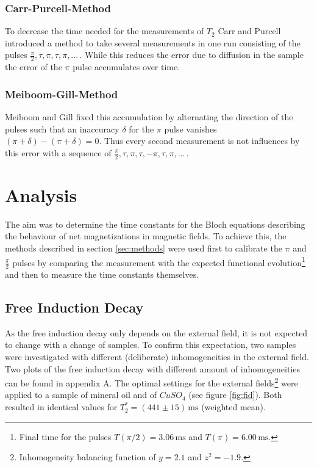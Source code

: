 \documentclass[a4paper]{scrartcl}
\numberwithin{equation}{section}
\numberwithin{figure}{section}
\numberwithin{table}{section}
\begin{document}
\subsubsection*{Carr-Purcell-Method}
To decrease the time needed for the measurements of $T_2$ Carr and Purcell introduced a method to take several measurements in one run consisting of the pulses $\frac{\pi}{2},\tau,\pi,\tau,\pi,...\,$. While this reduces the error due to diffusion in the sample the error of the $\pi$ pulse accumulates over time.

\subsubsection*{Meiboom-Gill-Method}
Meiboom and Gill fixed this accumulation by alternating the direction of the pulses such that an inaccuracy $\delta$ for the $\pi$ pulse vanishes $(\pi+\delta)-(\pi+\delta)=0$. Thus every second measurement is not influences by this error with a sequence of $\frac{\pi}{2},\tau,\pi,\tau,-\pi,\tau,\pi,...\,$.


\clearpage
\section{Analysis}
The aim was to determine the time constants for the Bloch equations describing the behaviour of net magnetizations in magnetic fields. To achieve this, the methods described in section \ref{sec:methods} were used first to calibrate the $\pi$ and $\frac{\pi}{2}$ pulses by comparing the measurement with the expected functional evolution\footnote{Final time for the pulses $T\left(\pi/2\right) = 3.06\,\text{ms}$ and $T\left(\pi\right) = 6.00\,\text{ms}$.} and then to measure the time constants themselves.

\subsection{Free Induction Decay}
As the free induction decay only depends on the external field, it is not expected to change with a change of samples. To confirm this expectation, two samples were investigated with different (deliberate) inhomogeneities in the external field. Two plots of the free induction decay with different amount of inhomogeneities can be found in appendix A. The optimal settings for the external fields\footnote{Inhomogeneity balancing function of $y=2.1$ and $z^2 = -1.9$.} were applied to a sample of mineral oil and of $CuSO_4$ (see figure \ref{fig:fid}). Both resulted in identical values for $T_2^* = (441\pm 15)\,\text{ms}$ (weighted mean).
\end{document}
